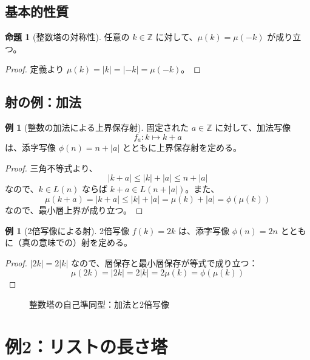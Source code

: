 \documentclass[a4paper,12pt]{ltjsarticle}
\theoremstyle{definition}
\newtheorem{example}[definition]{例}
\newtheorem{proposition}[definition]{命題}
\begin{document}
\subsection{基本的性質}

\begin{proposition}[整数塔の対称性]
\label{prop:int-symmetry}
任意の $k \in \mathbb{Z}$ に対して、$\mu(k) = \mu(-k)$ が成り立つ。
\end{proposition}

\begin{proof}
定義より $\mu(k) = |k| = |-k| = \mu(-k)$。
\end{proof}

\subsection{射の例：加法}

\begin{example}[整数の加法による上界保存射]
\label{ex:int-add}
固定された $a \in \mathbb{Z}$ に対して、加法写像
\[
f_a : k \mapsto k + a
\]
は、添字写像 $\phi(n) = n + |a|$ とともに上界保存射を定める。
\end{example}

\begin{proof}
三角不等式より、
\[
|k + a| \leq |k| + |a| \leq n + |a|
\]
なので、$k \in L(n)$ ならば $k + a \in L(n + |a|)$。また、
\[
\mu(k + a) = |k + a| \leq |k| + |a| = \mu(k) + |a| = \phi(\mu(k))
\]
なので、最小層上界が成り立つ。
\end{proof}

\begin{example}[2倍写像による射]
\label{ex:int-double}
2倍写像 $f(k) = 2k$ は、添字写像 $\phi(n) = 2n$ とともに（真の意味での）射を定める。
\end{example}

\begin{proof}
$|2k| = 2|k|$ なので、層保存と最小層保存が等式で成り立つ：
\[
\mu(2k) = |2k| = 2|k| = 2\mu(k) = \phi(\mu(k))
\]
\end{proof}

\begin{figure}[h]
\centering
{}
\caption{整数塔の自己準同型：加法と2倍写像}
\end{figure}

\section{例2：リストの長さ塔}
\end{document}
